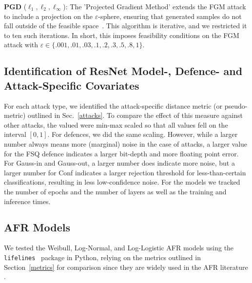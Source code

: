\textbf{PGD}  ($\ell_1, \ell_2, \ell_{\infty}$): The 'Projected Gradient Method' extends the FGM attack to include a projection on the $\varepsilon$-sphere, ensuring that generated samples do not fall outside of the feasible space~\citep{madry2017towards}. This algorithm is iterative, and we restricted it to ten such iterations. In short, this imposes feasibility conditions on the FGM attack with $\varepsilon \in \{.001,.01,.03,.1,.2,.3,.5,.8,1\}$.

\subsection{Identification of ResNet Model-, Defence- and Attack-Specific Covariates}
For each attack type, we identified the attack-specific distance metric (or pseudo-metric) outlined in Sec.~\ref{attacks}. To compare the effect of this measure against other attacks, the valued were min-max scaled so that all values fell on the interval $[0,1]$. For defences, we did the same scaling. However, while a larger number always means more (marginal) noise in the case of attacks, a larger value for the FSQ defence indicates a larger bit-depth and more floating point error. For Gauss-in and Gauss-out, a larger number does indicate more noise, but a larger number for Conf indicates a larger rejection threshold for less-than-certain classifications, resulting in less low-confidence noise. For the models we tracked the number of epochs and the number of layers as well as the training and inference times.


\subsection{AFR Models}
We tested the Weibull, Log-Normal, and Log-Logistic AFR models using the \texttt{lifelines}~\citep{lifelines} package in Python, relying on the metrics outlined in Section~\ref{metrics} for comparison since they are widely used in the AFR literature \citep{aft_models}.

